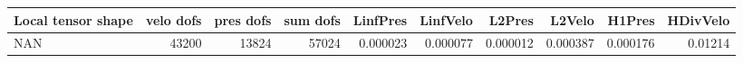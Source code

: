 \begin{tabular}{lrrrrrrrrr}
\toprule
Local tensor shape &  velo dofs &  pres dofs &  sum dofs &  LinfPres &  LinfVelo &   L2Pres &   L2Velo &   H1Pres &  HDivVelo \\
\midrule
               NAN &      43200 &      13824 &     57024 &  0.000023 &  0.000077 & 0.000012 & 0.000387 & 0.000176 &   0.01214 \\
\bottomrule
\end{tabular}
